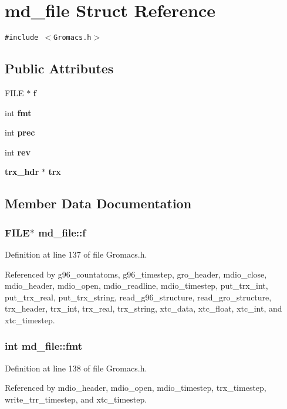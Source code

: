 \section{md\_\-file  Struct Reference}
\label{structmd__file}
{\tt \#include $<$Gromacs.h$>$}

\subsection*{Public Attributes}
\begin{CompactItemize}
\item 
FILE $\ast$ {\bf f}
\item 
int {\bf fmt}
\item 
int {\bf prec}
\item 
int {\bf rev}
\item 
{\bf trx\_\-hdr} $\ast$ {\bf trx}
\end{CompactItemize}


\subsection{Member Data Documentation}
\subsubsection{\setlength{\rightskip}{0pt plus 5cm}FILE$\ast$ md\_\-file::f}\label{structmd__file_m0}




Definition at line 137 of file Gromacs.h.

Referenced by g96\_\-countatoms, g96\_\-timestep, gro\_\-header, mdio\_\-close, mdio\_\-header, mdio\_\-open, mdio\_\-readline, mdio\_\-timestep, put\_\-trx\_\-int, put\_\-trx\_\-real, put\_\-trx\_\-string, read\_\-g96\_\-structure, read\_\-gro\_\-structure, trx\_\-header, trx\_\-int, trx\_\-real, trx\_\-string, xtc\_\-data, xtc\_\-float, xtc\_\-int, and xtc\_\-timestep.
\subsubsection{\setlength{\rightskip}{0pt plus 5cm}int md\_\-file::fmt}\label{structmd__file_m1}




Definition at line 138 of file Gromacs.h.

Referenced by mdio\_\-header, mdio\_\-open, mdio\_\-timestep, trx\_\-timestep, write\_\-trr\_\-timestep, and xtc\_\-timestep.

